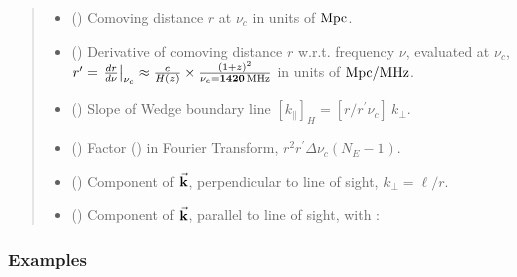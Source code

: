 \documentclass[a4paper,11pt,oneside,english,openany]{sphinxmanual}
\begin{document}
\begin{fulllineitems}
\begin{quote}
\begin{description}
\begin{itemize}
\end{itemize}

\sphinxAtStartPar
\begin{itemize}
\item {} 
\sphinxAtStartPar
{} () \textendash{} Comoving distance \(r\) at \(\nu_c\) in units of \(\rm Mpc\).

\item {} 
\sphinxAtStartPar
{} () \textendash{} Derivative of comoving distance \(r\) w.r.t. frequency \(\nu\), evaluated at \(\nu_c\), \(r^{\prime} = \left.\frac{dr}{d\nu}\right|_{\nu_c}\approx \tfrac{c}{H(z)}\times\tfrac{(1+z)^2}{\nu_e = \mathbf{1420\,\rm MHz}}\) in units of \(\rm Mpc/MHz\).

\item {} 
\sphinxAtStartPar
{} () \textendash{} Slope of Wedge boundary line  \([k_{\parallel}]_H = [r/{r^{\prime}\nu_c}]\, k_{\perp}\).

\item {} 
\sphinxAtStartPar
{} () \textendash{} Factor () in Fourier Transform, \(r^2r^{\prime}\Delta\nu_c(N_E-1)\).

\item {} 
\sphinxAtStartPar
{} () \textendash{} Component of \(\vec{\bf k}\), perpendicular to line of sight, \(k_{\perp} = \ell/r\).

\item {} 
\sphinxAtStartPar
{} () \textendash{} Component of \(\vec{\bf k}\), parallel to line of sight, with :

\begin{center}
\end{center}

\clearpage

\end{itemize}


\end{description}\end{quote}
\subsubsection*{Examples}


\end{fulllineitems}
\end{document}
